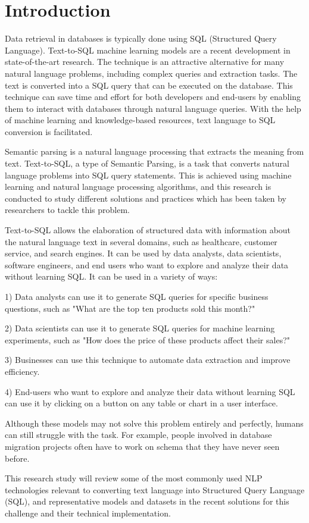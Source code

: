 \section{Introduction}

Data retrieval in databases is typically done using SQL (Structured Query Language). Text-to-SQL machine learning models are a recent development in state-of-the-art research. The technique is an attractive alternative for many natural language problems, including complex queries and extraction tasks. The text is converted into a SQL query that can be executed on the database. This technique can save time and effort for both developers and end-users by enabling them to interact with databases through natural language queries. With the help of machine learning and knowledge-based resources, text language to SQL conversion is facilitated.

Semantic parsing is a natural language processing that extracts the meaning from text. Text-to-SQL, a type of Semantic Parsing, is a task that converts natural language problems into SQL query statements. 
This is achieved using machine learning and natural language processing algorithms, and this research is conducted to study different solutions and practices which has been taken by researchers to tackle this problem.

Text-to-SQL allows the elaboration of structured data with information about the natural language text in several domains, such as healthcare, customer service, and search engines. It can be used by data analysts, data scientists, software engineers, and end users who want to explore and analyze their data without learning SQL.
It can be used in a variety of ways:

1) Data analysts can use it to generate SQL queries for specific business questions, such as "What are the top ten products sold this month?"

2) Data scientists can use it to generate SQL queries for machine learning experiments, such as "How does the price of these products affect their sales?"

3) Businesses can use this technique to automate data extraction and improve efficiency.

4) End-users who want to explore and analyze their data without learning SQL can use it by clicking on a button on any table or chart in a user interface.

Although these models may not solve this problem entirely and perfectly, humans can still struggle with the task. For example, people involved in database migration projects often have to work on schema that they have never seen before.

This research study will review some of the most commonly used NLP technologies relevant to converting text language into Structured Query Language (SQL), and representative models and datasets in the recent solutions for this challenge and their technical implementation.
